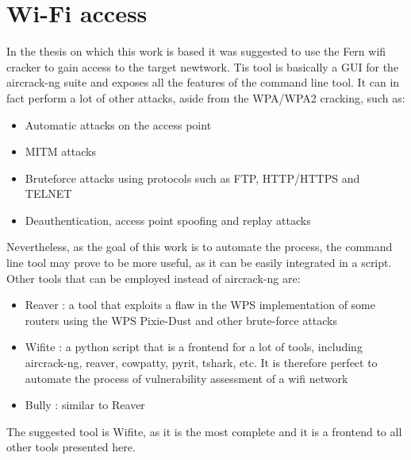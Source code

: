 \chapter{Wi-Fi access}
In the thesis on which \cite{previouswork} this work is based it was suggested
to use the Fern wifi cracker \cite{fern} to gain access to the target newtwork.
Tis tool is basically a GUI for the aircrack-ng suite \cite{aircrack} and
exposes all the features of the command line tool. It can in fact perform
a lot of other attacks, aside from the WPA/WPA2 cracking, such as:
\begin{itemize}
    \item Automatic attacks on the access point
    \item MITM attacks
    \item Bruteforce attacks using protocols such as FTP, HTTP/HTTPS and TELNET
    \item Deauthentication, access point spoofing and replay attacks
\end{itemize}

Nevertheless, as the goal of this work is to automate the process, the command
line tool may prove to be more useful, as it can be easily integrated in a
script.\\

Other tools that can be employed instead of aircrack-ng are:
\begin{itemize}
    \item Reaver \cite{reaver}: a tool that exploits a flaw in the WPS
        implementation of some routers using the WPS Pixie-Dust and other brute-force attacks
    \item Wifite \cite{wifite}: a python script that is a frontend for a lot of 
        tools, including aircrack-ng, reaver, cowpatty, pyrit, tshark, etc. It
        is therefore perfect to automate the process of vulnerability assessment
        of a wifi network
    \item Bully \cite{bully}: similar to Reaver
\end{itemize}

The suggested tool is Wifite, as it is the most complete and it is a frontend
to all other tools presented here.\\

\newpage